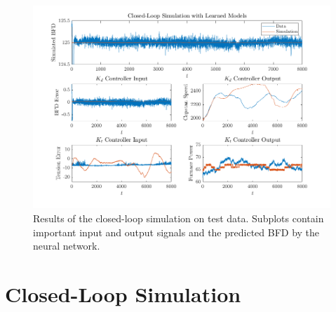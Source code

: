 \begin{figure}[ht!]
    \centering
    \includegraphics[width=\textwidth]{figures/closed_loop_simulation.png}
    \caption{Results of the closed-loop simulation on test data. Subplots contain important input and output signals and the predicted BFD by the neural network.}
    \label{fig:closed_loop_sim}
\end{figure}

\section{Closed-Loop Simulation} \label{ch:res:sim}

